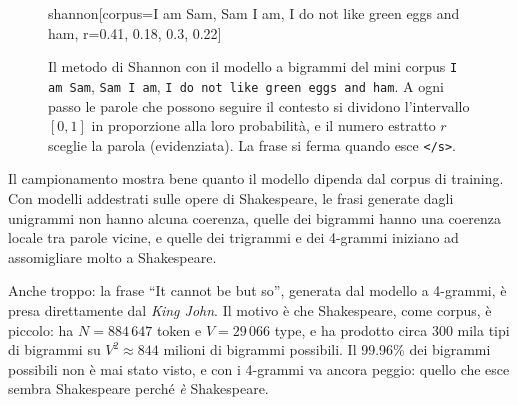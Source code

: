 \begin{figure}[htbp]
\centering
\begin{widget}{shannon}[corpus={I am Sam, Sam I am, I do not like green eggs and ham}, r={0.41, 0.18, 0.3, 0.22}]
\end{widget}
\caption{Il metodo di Shannon con il modello a bigrammi del mini corpus \texttt{I am Sam}, \texttt{Sam I am}, \texttt{I do not like green eggs and ham}. A ogni passo le parole che possono seguire il contesto si dividono l'intervallo $[0, 1]$ in proporzione alla loro probabilità, e il numero estratto $r$ sceglie la parola (evidenziata). La frase si ferma quando esce \texttt{</s>}.}
\label{fig:shannon}
\end{figure}

Il campionamento mostra bene quanto il modello dipenda dal corpus di training. Con modelli addestrati sulle opere di Shakespeare, le frasi generate dagli unigrammi non hanno alcuna coerenza, quelle dei bigrammi hanno una coerenza locale tra parole vicine, e quelle dei trigrammi e dei 4-grammi iniziano ad assomigliare molto a Shakespeare.

Anche troppo: la frase \enquote{It cannot be but so}, generata dal modello a 4-grammi, è presa direttamente dal \textit{King John}. Il motivo è che Shakespeare, come corpus, è piccolo: ha $N = 884\,647$ token e $V = 29\,066$ type, e ha prodotto circa 300 mila tipi di bigrammi su $V^2 \approx 844$ milioni di bigrammi possibili. Il 99.96\% dei bigrammi possibili non è mai stato visto, e con i 4-grammi va ancora peggio: quello che esce sembra Shakespeare perché \textit{è} Shakespeare.


